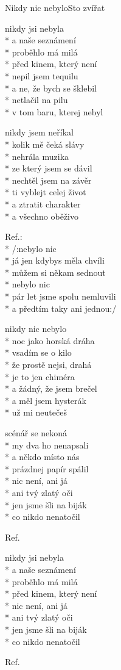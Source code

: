 \documentclass[10.5pt]{book}
\begin{document}
\begin{poem}{Nikdy nic nebylo}{Sto zvířat}

\settowidth{\versewidth}{Člověk ze zoufalství snadno pomate se}

nikdy jsi nebyla\\*
a naše seznámení\\*
proběhlo má milá\\*
před kinem, který není\\*
nepil jsem tequilu\\*
a ne, že bych se šklebil\\*
netlačil na pilu\\*
v tom baru, kterej nebyl

nikdy jsem neříkal\\*
kolik mě čeká slávy\\*
nehrála muzika\\*
ze který jsem se dávil\\*
nechtěl jsem na závěr\\*
ti vyblejt celej život\\*
a ztratit charakter\\*
a všechno oběživo

Ref.:\\*
/:nebylo nic\\*
já jen kdybys měla chvíli\\*
můžem si někam sednout\\*
nebylo nic\\*
pár let jsme spolu nemluvili\\*
a předtím taky ani jednou:/

nikdy nic nebylo\\*
noc jako horská dráha\\*
vsadím se o kilo\\*
že prostě nejsi, drahá\\*
je to jen chiméra\\*
a žádný, že jsem brečel\\*
a měl jsem hysterák\\*
už mi neutečeš

scénář se nekoná\\*
my dva ho nenapsali\\*
a někdo místo nás\\*
prázdnej papír spálil\\*
nic není, ani já\\*
ani tvý zlatý oči\\*
jen jsme šli na biják\\*
co nikdo nenatočil

Ref.

nikdy jsi nebyla\\*
a naše seznámení\\*
proběhlo má milá\\*
před kinem, který není\\*
nic není, ani já\\*
ani tvý zlatý oči\\*
jen jsme šli na biják\\*
co nikdo nenatočil

Ref.

\end{poem}
\end{document}
